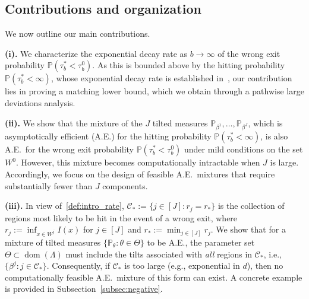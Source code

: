 \documentclass[aap,preprint]{imsart}
\newcommand{\Pro}{{\mathbb{P}}}
\theoremstyle{plain}
\theoremstyle{definition}
\begin{document}
\subsection{Contributions and organization}
We now outline our main contributions.


\smallskip
\noindent\textbf{(i).} We characterize the exponential decay rate as $b \to \infty$ of the wrong exit probability $\Pro\left(\tau_{b}^{*} < \tau_b^{0} \right)$. As this  is bounded above by the hitting probability $\Pro\left(\tau_{b}^{*} < \infty\right)$, whose exponential decay rate is established in~\cite{collamore1996}, our contribution lies in proving a matching lower bound, which we obtain through a pathwise large deviations analysis.


 


\smallskip
\noindent\textbf{(ii).} We show that the mixture of the $J$ tilted measures $\mathbb{P}_{\beta^1}, \ldots, \mathbb{P}_{\beta^J}$, which is asymptotically efficient (A.E.) for the hitting probability $\Pro\left(\tau_{b}^{*} < \infty\right)$, is also A.E.~for the wrong exit probability $\Pro\left(\tau_{b}^{*} < \tau_b^{0}\right)$ under mild conditions on the set $W^0$. However,  this mixture becomes computationally intractable when $J$ is large. Accordingly, we focus on the design of  feasible A.E.~mixtures that require substantially fewer than $J$ components.

\smallskip
\noindent\textbf{(iii).} In view of~\eqref{def:intro_rate}, 
$\mathcal{C}_* := \{j \in [J] : r_j = r_*\}$  is the collection of regions most likely to be hit in the event of a wrong exit, where $r_j := \inf_{x \in W^j} I(x)$ for $j \in [J]$ and $r_* := \min_{j \in [J]} r_j$. We show that for a mixture of tilted measures $\{\mathbb{P}_\theta : \theta \in \Theta\}$ to be A.E., the parameter set $\Theta \subset \operatorname{dom}(\Lambda)$ must include the tilts associated with \textit{all} regions in $\mathcal{C}_*$, i.e., $\{\beta^j : j \in \mathcal{C}_*\}$. Consequently, if $\mathcal{C}_*$ is too large (e.g., exponential in $d$), then no computationally feasible A.E.~mixture of this form can exist. A concrete example is provided in Subsection~\ref{subsec:negative}.
\end{document}
